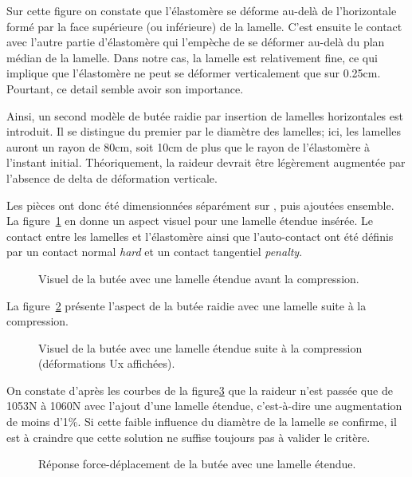 ﻿\documentclass{article}
\newcommand{\abaqus}{\bsc{Abaqus}\xspace}
\begin{document}
Sur cette figure on constate que l'élastomère se déforme au-delà de l'horizontale formé par la face supérieure (ou inférieure) de la lamelle. C'est ensuite le contact avec l'autre partie d'élastomère qui l'empèche de se déformer au-delà du plan médian de la lamelle. Dans notre cas, la lamelle est relativement fine, ce qui implique que l'élastomère ne peut se déformer verticalement que sur 0.25cm. Pourtant, ce detail semble avoir son importance.

Ainsi, un second modèle de butée raidie par insertion de lamelles horizontales est introduit. Il se distingue du premier par le diamètre des lamelles; ici, les lamelles auront un rayon de 80cm, soit 10cm de plus que le rayon de l'élastomère à l'instant initial. Théoriquement, la raideur devrait être légèrement augmentée par l'absence de delta de déformation verticale.

Les pièces ont donc été dimensionnées séparément sur \abaqus, puis ajoutées ensemble. La figure~\ref{fig17} en donne un aspect visuel pour une lamelle étendue insérée. Le contact entre les lamelles et l'élastomère ainsi que l'auto-contact ont été définis par un contact normal \textit{hard} et un contact tangentiel \textit{penalty}.

\begin{figure}[!h]
	\centering
	\caption{Visuel de la butée avec une lamelle étendue avant la compression.}
	\label{fig17}
\end{figure}

La figure~\ref{fig18} présente l'aspect de la butée raidie avec une lamelle suite à la compression.

\begin{figure}[!h]
	\centering
	\caption{Visuel de la butée avec une lamelle étendue suite à la compression (déformations Ux affichées).}
	\label{fig18}
\end{figure}

On constate d'après les courbes de la figure\ref{fig19} que la raideur n'est passée que de 1053N à 1060N avec l'ajout d'une lamelle étendue, c'est-à-dire une augmentation de moins d'1\%. Si cette faible influence du diamètre de la lamelle se confirme, il est à craindre que cette solution ne suffise toujours pas à valider le critère.

\begin{figure}[!h]
	\centering
	\caption{Réponse force-déplacement de la butée avec une lamelle étendue.}
	\label{fig19}
\end{figure}
\end{document}
